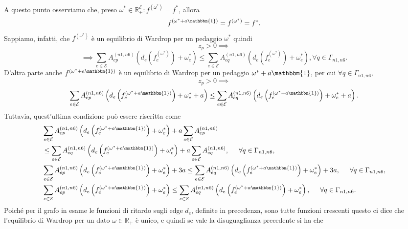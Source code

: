 \begin{alphaparts}
A questo punto osserviamo che, preso \(\omega^*\in\mathbb{R}_{+}^{\mathcal{E}} : f^{(\omega^*)} = f^{*}\), allora
\[ f^{(\omega^{*} + a\mathbbm{1})} = f^{(\omega^*)} = f^{*}. \]
Sappiamo, infatti, che $f^{(\omega^*)}$ è un equilibrio di Wardrop per un pedaggio $\omega^*$ quindi
\[z_p>0\implies\]
\[\implies \sum_{e\in\mathcal{E}} A_{ep}^{(n1,n6)} \left(d_{e}\left(f_{e}^{(\omega^*)}\right)+\omega_{e}^{*}\right) \le \sum_{e\in\mathcal{E}} A_{eq}^{(n1,n6)} \left(d_{e}\left(f_{e}^{(\omega^*)}\right)+\omega_{e}^{*}\right), \forall q \in \Gamma_{n1,n6}. \]
D'altra parte anche  $f^{(\omega^{*} + a\mathbbm{1})}$ è un equilibrio di Wardrop per un pedaggio $\omega^{*} + a\mathbbm{1}$, per cui \( \forall q \in \Gamma_{n1,n6},\)
\[z_p>0\implies\]
\[\sum_{e\in\mathcal{E}} A_{ep}^{(n1,n6)} \left(d_{e}\left(f_{e}^{(\omega^{*} + a\mathbbm{1})}\right)+\omega_{e}^{*} + a \right) \le \sum_{e\in\mathcal{E}} A_{eq}^{(n1,n6)} \left(d_{e}\left(f_{e}^{(\omega^{*} + a\mathbbm{1})}\right)+\omega_{e}^{*} + a \right). \]
Tuttavia, quest'ultima condizione può essere riscritta come
\begin{align}
&\sum_{e\in\mathcal{E}} A_{ep}^{(n1,n6)} \left(d_{e}\left(f_{e}^{(\omega^{*} + a\mathbbm{1})}\right)+\omega_{e}^{*} \right)+ a\sum_{e\in\mathcal{E}} A_{ep}^{(n1,n6)} \nonumber\\ 
&\le \sum_{e\in\mathcal{E}} A_{eq}^{(n1,n6)} \left(d_{e}\left(f_{e}^{(\omega^{*} + a\mathbbm{1})}\right)+\omega_{e}^{*}\right) + a\sum_{e\in\mathcal{E}} A_{eq}^{(n1,n6)} , \hspace{0.5cm} \forall q \in \Gamma_{n1,n6},\nonumber\\
&\sum_{e\in\mathcal{E}} A_{ep}^{(n1,n6)} \left(d_{e}\left(f_{e}^{(\omega^{*} + a\mathbbm{1})}\right)+\omega_{e}^{*} \right) + 3a \le \sum_{e\in\mathcal{E}} A_{eq}^{(n1,n6)} \left(d_{e}\left(f_{e}^{(\omega^{*} + a\mathbbm{1})}\right)+\omega_{e}^{*}\right) +3a , \hspace{0.5cm} \forall q \in \Gamma_{n1,n6},\nonumber\\
&\sum_{e\in\mathcal{E}} A_{ep}^{(n1,n6)} \left(d_{e}\left(f_{e}^{(\omega^{*} + a\mathbbm{1})}\right)+\omega_{e}^{*} \right) \le \sum_{e\in\mathcal{E}} A_{eq}^{(n1,n6)} \left(d_{e}\left(f_{e}^{(\omega^{*} + a\mathbbm{1})}\right)+\omega_{e}^{*}\right) , \hspace{0.5cm} \forall q \in \Gamma_{n1,n6}.\nonumber
\end{align}
Poiché per il grafo in esame le funzioni di ritardo sugli edge $d_{e}$, definite in precedenza, sono tutte funzioni crescenti questo ci dice che l'equilibrio di Wardrop per un dato $\omega\in\mathbb{R}_{+}$ è unico, e quindi se vale la disuguaglianza precedente si ha che

\end{alphaparts}
